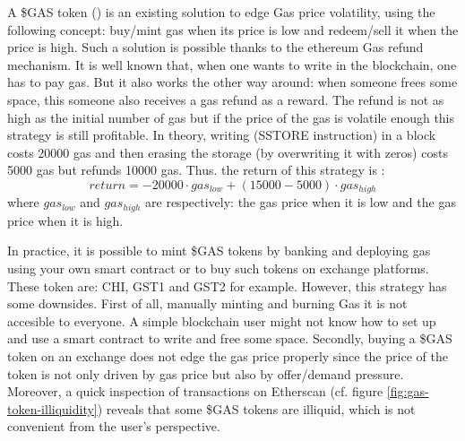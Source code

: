 A \$GAS token (\cite{noauthor_gastokenio_nodate}) is an existing solution to edge Gas price volatility, using the following concept: buy/mint gas when its price is low and redeem/sell it when the price is high. Such a solution is possible thanks to the ethereum Gas refund mechanism. It is well known that, when one wants to write in the blockchain, one has to pay gas. But it also works the other way around: when someone frees some space, this someone also receives a gas refund as a reward. The refund is not as high as the initial number of gas but if the price of the gas is volatile enough this strategy is still profitable. In theory, writing (SSTORE instruction)  in a block costs 20000 gas and then erasing the storage (by overwriting it with zeros) costs 5000 gas but refunds 10000 gas. Thus. the return of this strategy is :
$$return=-20000\cdot gas_{low}+(15000-5000)\cdot gas_{high}$$
where 
$gas_{low}$ and $gas_{high}$ are respectively: the gas price when it is low and the gas price when it is high. 

In practice, it is possible to mint \$GAS tokens by banking and deploying gas using your own smart contract or to buy such tokens on exchange platforms. These token are: CHI, GST1 and GST2 for example. However, this strategy has some downsides.
First of all, manually minting and burning Gas it is not accesible to everyone. A simple blockchain user might not know how to set up and use a smart contract to write and free some space. 
Secondly, buying a \$GAS token on an exchange does not edge the gas price properly since the price of the token is not only driven by gas price but also by offer/demand pressure. 
Moreover, a quick inspection of transactions on Etherscan (cf. figure \ref{fig:gas-token-illiquidity}) reveals that some \$GAS tokens are illiquid, which is not convenient from the user's perspective.


